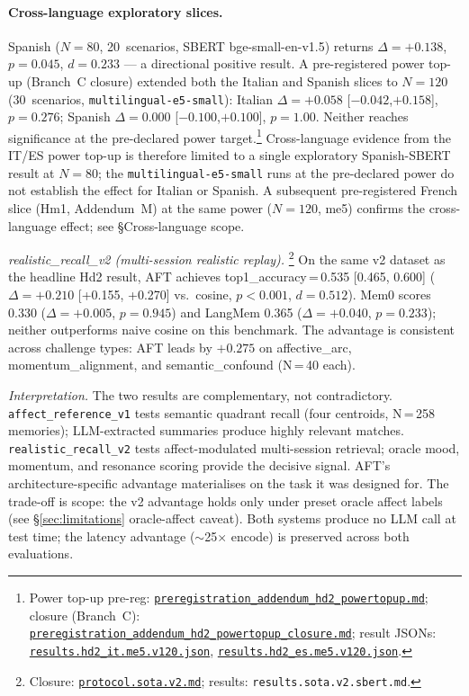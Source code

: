 \documentclass[11pt]{article}
\newcommand{\repourl}{https://github.com/gianlucamazza/emotional-memory}%
\begin{document}
\paragraph{Cross-language exploratory slices.}
Spanish ($N=80$, 20~scenarios, SBERT bge-small-en-v1.5) returns
$\Delta=+0.138$, $p=0.045$, $d=0.233$ — a directional positive result.
A pre-registered power top-up (Branch~C closure) extended both the Italian and
Spanish slices to $N=120$ (30~scenarios, \texttt{multilingual-e5-small}):
Italian $\Delta=+0.058$ [$-0.042$,\;$+0.158$], $p=0.276$;
Spanish $\Delta=0.000$ [$-0.100$,\;$+0.100$], $p=1.00$.
Neither reaches significance at the pre-declared power target.\footnote{Power
top-up pre-reg:
\href{\repourl/blob/main/benchmarks/preregistration\_addendum\_hd2\_powertopup.md}%
{\texttt{preregistration\_addendum\_hd2\_powertopup.md}};
closure (Branch~C):
\href{\repourl/blob/main/benchmarks/preregistration\_addendum\_hd2\_powertopup\_closure.md}%
{\texttt{preregistration\_addendum\_hd2\_powertopup\_closure.md}};
result JSONs:
\href{\repourl/blob/main/benchmarks/appraisal\_confound/results.hd2\_it.me5.v120.json}%
{\texttt{results.hd2\_it.me5.v120.json}},
\href{\repourl/blob/main/benchmarks/appraisal\_confound/results.hd2\_es.me5.v120.json}%
{\texttt{results.hd2\_es.me5.v120.json}}.}
Cross-language evidence from the IT/ES power top-up is therefore limited to a
single exploratory Spanish-SBERT result at $N=80$; the \texttt{multilingual-e5-small}
runs at the pre-declared power do not establish the effect for Italian or Spanish.
A subsequent pre-registered French slice (Hm1, Addendum~M) at the same power ($N=120$,
me5) confirms the cross-language effect; see §Cross-language scope.


\textit{realistic\_recall\_v2 (multi-session realistic replay).}%
\footnote{Closure: \href{\repourl/blob/main/benchmarks/comparative/protocol.sota.v2.md}%
{\texttt{protocol.sota.v2.md}}; results: \texttt{results.sota.v2.sbert.md}.}
On the same v2 dataset as the headline Hd2 result,
AFT achieves top1\_accuracy\,=\,0.535 [0.465, 0.600]
($\Delta=+0.210$ [+0.155, +0.270] vs.\ cosine, $p<0.001$, $d=0.512$).
Mem0 scores 0.330 ($\Delta=+0.005$, $p=0.945$) and
LangMem 0.365 ($\Delta=+0.040$, $p=0.233$);
neither outperforms naive cosine on this benchmark.
The advantage is consistent across challenge types:
AFT leads by $+0.275$ on affective\_arc, momentum\_alignment,
and semantic\_confound (N\,=\,40 each).

\textit{Interpretation.}
The two results are complementary, not contradictory.
\texttt{affect\_reference\_v1} tests semantic quadrant recall (four centroids,
N\,=\,258 memories); LLM-extracted summaries produce highly relevant
matches.  \texttt{realistic\_recall\_v2} tests affect-modulated multi-session
retrieval; oracle mood, momentum, and resonance scoring provide the decisive
signal.  AFT's architecture-specific advantage materialises on the task it was
designed for.  The trade-off is scope: the v2 advantage holds only under
preset oracle affect labels (see \S\ref{sec:limitations} oracle-affect caveat).
Both systems produce no LLM call at test time; the latency advantage
($\sim$25$\times$ encode) is preserved across both evaluations.
\end{document}
